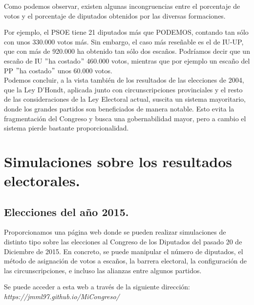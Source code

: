 \documentclass[11pt]{article}
\newcommand\console[1]{{\inconsolata #1}}
\begin{document}

	
		\enlargethispage{2\baselineskip}
	Como podemos observar, existen algunas incongruencias entre el porcentaje de votos y el porcentaje de diputados obtenidos por las diversas formaciones.
	
	Por ejemplo, el PSOE tiene 21 diputados más que PODEMOS, contando tan sólo con unos 330.000 votos más. Sin embargo, el caso más reseñable es el de IU-UP, que con más de 920.000 ha obtenido tan sólo dos escaños. Podríamos decir que un escaño de IU $"$ha costado$"$  460.000 votos, mientras que por ejemplo un escaño del PP $"$ha costado$"$ unos 60.000 votos.\\
	
	Podemos concluir, a la vista también de los resultados de las elecciones de 2004, que la Ley D'Hondt, aplicada junto con circunscripciones provinciales y el resto de las consideraciones de la Ley Electoral actual, suscita un sistema mayoritario, donde los grandes partidos son beneficiados de manera notable. Esto evita la fragmentación del Congreso y busca una gobernabilidad mayor, pero a cambio el sistema pierde bastante proporcionalidad.
	
	\newpage
	
	
	\section{Simulaciones sobre los resultados electorales.}
	\subsection{Elecciones del año 2015.}
	
	Proporcionamos una página web donde se pueden realizar simulaciones de distinto tipo sobre las elecciones al Congreso de los Diputados del pasado 20 de Diciembre de 2015. En concreto, se puede manipular el número de diputados, el método de asignación de votos a escaños, la barrera electoral, la configuración de las circunscripciones, e incluso las alianzas entre algunos partidos.
	
	Se puede acceder a esta web a través de la siguiente dirección:\\
	
	\vspace{-1em}
	\console{\textit{https://jmml97.github.io/MiCongreso/}}
	
\end{document}
